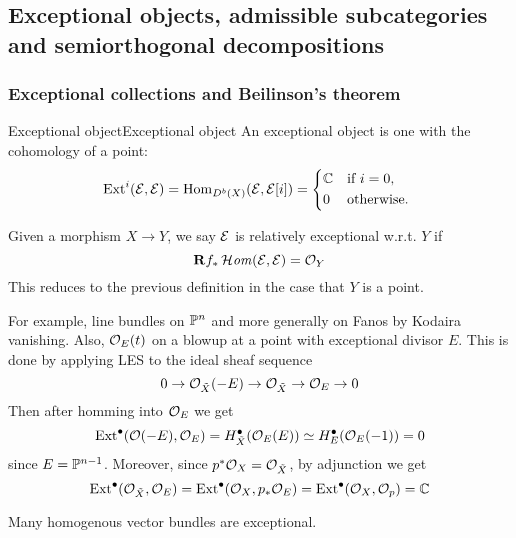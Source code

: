 \subsection{Exceptional objects, admissible subcategories and semiorthogonal decompositions}

\subsubsection{Exceptional collections and Beilinson's theorem}

\begin{definition}{Exceptional object}{Exceptional object}
    An exceptional object is one with the cohomology of a point:
    \begin{equation*}
        \Ext^i(\calE,\calE) = \Hom_{D^b(X)}(\calE,\calE[i]) = \begin{cases*}
            \C & if $i=0$, \\
            0 & otherwise.
        \end{cases*}
    \end{equation*}

    Given a morphism $X\rightarrow Y$, we say $\calE$ is relatively exceptional w.r.t. $Y$ if $$\dR f_* \lHom(\calE, \calE)=\O_Y$$
    This reduces to the previous definition in the case that $Y$ is a point.
\end{definition}

For example, line bundles on $\P^n$ and more generally on Fanos by Kodaira vanishing. Also, $\O_{E}(t)$ on a blowup at a point with exceptional divisor $E$. This is done by applying LES to the ideal sheaf sequence
\begin{equation*}
    0 \to \O_{\tilde X}(-E) \to \O_{\tilde X} \to \O_E \to 0
\end{equation*}
Then after homming into $\O_E$ we get
\begin{equation*}
    \Ext^\bullet(\O(-E),\O_E)
        = H^\bullet_{\tilde X}(\O_E(E))
        \simeq H^\bullet_E(\O_E(-1))=0
\end{equation*}
since $E=\P^{n-1}$. Moreover, since $p^*\O_X=\O_{\tilde X}$, by adjunction we get
\begin{equation*}
    \Ext^\bullet(\O_{\tilde X},\O_E)
        = \Ext^\bullet(\O_X,p_*\O_E)
        = \Ext^\bullet(\O_X,\O_p)
        = \C
\end{equation*}

Many homogenous vector bundles are exceptional.

